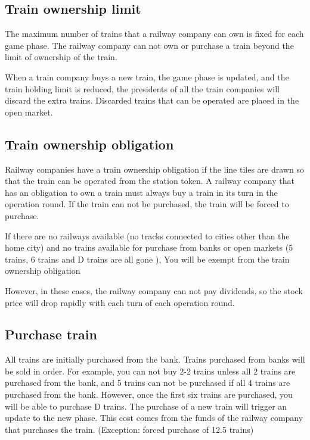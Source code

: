 \documentclass{article}
\begin{document}
\begin{CJK}{UTF8}{min}
\subsection{Train ownership limit}

The maximum number of trains that a railway company can own is fixed
for each game phase. The railway company can not own or purchase a
train beyond the limit of ownership of the train.

When a train company buys a new train, the game phase is updated, and
the train holding limit is reduced, the presidents of all the train
companies will discard the extra trains. Discarded trains that can be
operated are placed in the open market.

\subsection{Train ownership obligation}

Railway companies have a train ownership obligation if the line tiles
are drawn so that the train can be operated from the station token. A
railway company that has an obligation to own a train must always buy
a train in its turn in the operation round. If the train can not be
purchased, the train will be forced to purchase.

If there are no railways available (no tracks connected to cities
other than the home city) and no trains available for purchase from
banks or open markets (5 trains, 6 trains and D trains are all gone ),
You will be exempt from the train ownership obligation

However, in these cases, the railway company can not pay dividends, so
the stock price will drop rapidly with each turn of each operation
round.

\subsection{Purchase train}

All trains are initially purchased from the bank. Trains purchased
from banks will be sold in order. For example, you can not buy 2-2
trains unless all 2 trains are purchased from the bank, and 5 trains
can not be purchased if all 4 trains are purchased from the
bank. However, once the first six trains are purchased, you will be
able to purchase D trains. The purchase of a new train will trigger an
update to the new phase. This cost comes from the funds of the railway
company that purchases the train. (Exception: forced purchase of 12.5
trains)


\end{CJK}
\end{document}
